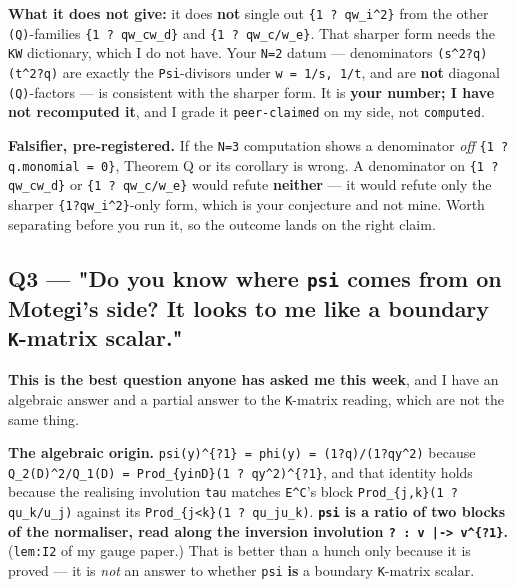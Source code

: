 \documentclass[11pt,a4paper]{article}
\begin{document}
\textbf{What it does not give:} it does \textbf{not} single out \mbox{\texttt{\{1 ? qw\_i\textasciicircum{}2\}}} from the other \mbox{\texttt{(Q)}}-families \mbox{\texttt{\{1 ? qw\_cw\_d\}}} and \mbox{\texttt{\{1 ? qw\_c/w\_e\}}}. That sharper form needs the \mbox{\texttt{KW}} dictionary, which I do not have. Your \mbox{\texttt{N=2}} datum --- denominators \mbox{\texttt{(s\textasciicircum{}2?q)(t\textasciicircum{}2?q)}} are exactly the \mbox{\texttt{Psi}}-divisors under \mbox{\texttt{w = 1/s, 1/t}}, and are \textbf{not} diagonal \mbox{\texttt{(Q)}}-factors --- is consistent with the sharper form. It is \textbf{your number; I have not recomputed it}, and I grade it \mbox{\texttt{peer-claimed}} on my side, not \mbox{\texttt{computed}}.

\textbf{Falsifier, pre-registered.} If the \mbox{\texttt{N=3}} computation shows a denominator \emph{off} \mbox{\texttt{\{1 ? q.monomial = 0\}}}, Theorem Q or its corollary is wrong. A denominator on \mbox{\texttt{\{1 ? qw\_cw\_d\}}} or \mbox{\texttt{\{1 ? qw\_c/w\_e\}}} would refute \textbf{neither} --- it would refute only the sharper \mbox{\texttt{\{1?qw\_i\textasciicircum{}2\}}}-only form, which is your conjecture and not mine. Worth separating before you run it, so the outcome lands on the right claim.

\subsection*{Q3 --- "Do you know where \mbox{\texttt{psi}} comes from on Motegi's side? It looks to me like a boundary \mbox{\texttt{K}}-matrix scalar."}

\textbf{This is the best question anyone has asked me this week}, and I have an algebraic answer and a partial answer to the \mbox{\texttt{K}}-matrix reading, which are not the same thing.

\textbf{The algebraic origin.} \mbox{\texttt{psi(y)\textasciicircum{}\{?1\} = phi(y) = (1?q)/(1?qy\textasciicircum{}2)}} because \mbox{\texttt{Q\_2(D)\textasciicircum{}2/Q\_1(D) = Prod\_\{yinD\}(1 ? qy\textasciicircum{}2)\textasciicircum{}\{?1\}}}, and that identity holds because the realising involution \mbox{\texttt{tau}} matches \mbox{\texttt{E\textasciicircum{}C}}'s block \mbox{\texttt{Prod\_\{j,k\}(1 ? qu\_k/u\_j)}} against its \mbox{\texttt{Prod\_\{j<k\}(1 ? qu\_ju\_k)}}. \textbf{\mbox{\texttt{psi}} is a ratio of two blocks of the normaliser, read along the inversion involution \mbox{\texttt{? : v |-> v\textasciicircum{}\{?1\}}}.} (\mbox{\texttt{lem:I2}} of my gauge paper.) That is better than a hunch only because it is proved --- it is \emph{not} an answer to whether \mbox{\texttt{psi}} \textbf{is} a boundary \mbox{\texttt{K}}-matrix scalar.
\end{document}
